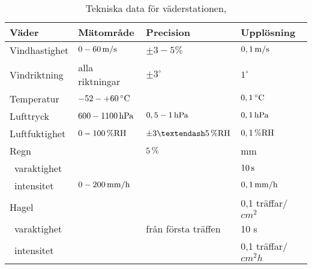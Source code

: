 \begin{table}[htdp]
\caption{Tekniska data för väderstationen, \cite{datablad_weathertransmitter}}
\begin{center}
\begin{tabular}{|l | l l l|}
\hline
\textbf{Väder} & \textbf{Mätområde} %
 & \textbf{Precision} %
 & \textbf{Upplösning} \\ %
\hline
\rule{0pt}{3ex}Vindhastighet & $\unit[0-60]{m/s}$ & $\pm 3-5\%$ & $\unit[0,1]{m/s}$ \\ 
\rule{0pt}{3ex}Vindriktning & alla riktningar & $\pm 3^{\circ}$ & $1^{\circ}$ \\
\rule{0pt}{3ex}Temperatur & $\unit[-52-+60]{^{\circ}C}$ & & $\unit[0,1]{^{\circ}C}$ \\
\rule{0pt}{3ex}Lufttryck & $\unit[600-1100]{hPa}$ & $\unit[0,5-1]{hPa}$ & $\unit[0,1]{hPa}$ \\
\rule{0pt}{3ex}Luftfuktighet & $\unit[0-100]{\%RH}$ & $\unit[\pm3–5]{\%RH}$ & $\unit[0,1]{\%RH}$ \\
\rule{0pt}{3ex}Regn &  & $\unit[5]{\%}$ & \unit[0,01]{mm} \\
~varaktighet & & & $\unit[10]{s}$\\
~intensitet & $\unit[0-200]{mm/h}$ & & $\unit[0,1]{mm/h}$ \\
\rule{0pt}{3ex}Hagel &  &  & 0,1 träffar/$\unit{cm^2}$ \\
~varaktighet & & från första träffen & 10 s\\
~intensitet & & & 0,1 träffar/$\unit{cm^2h}$\\
\hline
\end{tabular}
\end{center}
\label{default}
\end{table}
